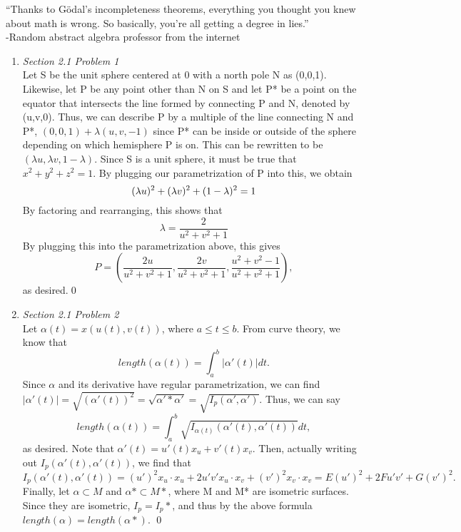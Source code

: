 \documentclass{article}
\begin{document}
``Thanks to G\"{o}dal's incompleteness theorems, everything you thought you knew about math is wrong.
So basically, you're all getting a degree in lies.''\\
-Random abstract algebra professor from the internet

\begin{enumerate}

\item \textit{Section 2.1 Problem 1}\\

Let S be the unit sphere centered at 0 with a north pole N as (0,0,1).
Likewise, let P be any point other than N on S and let P* be a point on the equator that intersects the line formed by connecting P and N, denoted by (u,v,0).
Thus, we can describe P by a multiple of the line connecting N and P*, $(0,0,1)+\lambda(u,v,-1)$ since P* can be inside or outside of the sphere depending on which hemisphere P is on.
This can be rewritten to be $(\lambda u, \lambda v, 1-\lambda)$. 
Since S is a unit sphere, it must be true that $x^2+y^2+z^2=1$.
By plugging our parametrization of P into this, we obtain
\begin{equation*}
(\lambda u)^2+(\lambda v)^2 + (1-\lambda)^2 = 1\\
\end{equation*}
By factoring and rearranging, this shows that 
\begin{equation*}
\lambda = \frac{2}{u^2+v^2+1}
\end{equation*}
By plugging this into the parametrization above, this gives
\begin{equation*}
P = \left(\frac{2u}{u^2+v^2+1},\frac{2v}{u^2+v^2+1},\frac{u^2+v^2-1}{u^2+v^2+1}\right),
\end{equation*}
as desired.\qed

\item \textit{Section 2.1 Problem 2}\\

Let $\alpha(t) = x(u(t),v(t))$, where $a \leq t \leq b$.
From curve theory, we know that 
\begin{equation*}
length(\alpha(t)) = \displaystyle\int_a^b |\alpha'(t)|dt.
\end{equation*}
Since $\alpha$ and its derivative have regular parametrization, we can find $|\alpha'(t)| = \sqrt{(\alpha'(t))^2} = \sqrt{\alpha'*\alpha'} = \sqrt{I_p(\alpha',\alpha')}$.
Thus, we can say
\begin{equation*}
length(\alpha(t)) = \displaystyle\int_a^b\sqrt{I_{\alpha(t)}(\alpha'(t),\alpha'(t))}dt,
\end{equation*}
as desired.
Note that $\alpha'(t) = u'(t)x_u+v'(t)x_v$.
Then, actually writing out $I_p(\alpha'(t),\alpha'(t))$, we find that 
\begin{equation*}
I_p(\alpha'(t),\alpha'(t)) = (u')^2x_u\cdot x_u + 2u'v'x_u\cdot x_v + (v')^2x_v \cdot x_v = E(u')^2 + 2Fu'v' + G(v')^2.
\end{equation*}
Finally, let $\alpha \subset M$ and $\alpha* \subset M*$, where M and M* are isometric surfaces.
Since they are isometric, $I_p=I_p*$, and thus by the above formula $length(\alpha) = length(\alpha*)$. \qed


\end{enumerate}
\end{document}
